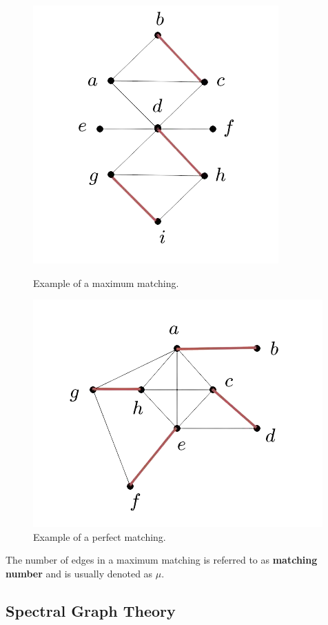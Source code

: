 \documentclass[11pt]{article}
\theoremstyle{definition}
\begin{document}
\begin{figure}[H]
   \begin{minipage}{0.5\textwidth}
     \centering
     \includegraphics[width=.65\linewidth]{images/maximum_matching.jpeg}
     \caption{Example of a maximum matching.}\label{fig:maximum_matching}
   \end{minipage}\hfill
   \begin{minipage}{0.5\textwidth}
     \centering
     \includegraphics[width=.8\linewidth]{images/perfect_matching.jpeg}
     \caption{Example of a perfect matching.}\label{fig:perfect_matching}
   \end{minipage}
\end{figure}

The number of edges in a maximum matching is referred to as \textbf{matching number} and is usually denoted as $\mu$.

\subsection{Spectral Graph Theory}
\end{document}
